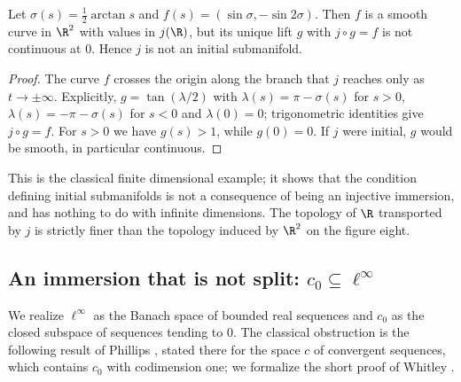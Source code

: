 \begin{theorem}
  \label{thm:ex-lemniscate-not-initial}
  \leanok
  Let $\sigma(s) = \tfrac12\arctan s$ and $f(s) = (\sin\sigma, -\sin 2\sigma)$. Then $f$ is a
  smooth curve in $\R^2$ with values in $j(\R)$, but its unique lift $g$ with $j \circ g = f$ is
  not continuous at $0$. Hence $j$ is not an initial submanifold.
\end{theorem}

\begin{proof}
  \leanok
  The curve $f$ crosses the origin along the branch that $j$ reaches only as $t \to \pm\infty$.
  Explicitly, $g = \tan(\lambda/2)$ with $\lambda(s) = \pi - \sigma(s)$ for $s > 0$,
  $\lambda(s) = -\pi - \sigma(s)$ for $s < 0$ and $\lambda(0) = 0$; trigonometric identities give
  $j \circ g = f$. For $s > 0$ we have $g(s) > 1$, while $g(0) = 0$. If $j$ were initial, $g$
  would be smooth, in particular continuous.
\end{proof}

\begin{remark}
  This is the classical finite dimensional example; it shows that the condition defining
  initial submanifolds is not a consequence of being an injective immersion, and has nothing to
  do with infinite dimensions. The topology of $\R$ transported by $j$ is strictly finer than the
  topology induced by $\R^2$ on the figure eight.
\end{remark}

\subsection{An immersion that is not split: \texorpdfstring{$c_0 \subseteq \ell^\infty$}{c0 in l-infinity}}

We realize $\ell^\infty$ as the Banach space of bounded real sequences and $c_0$ as the closed
subspace of sequences tending to $0$. The classical obstruction is the following result of
Phillips \cite[7.5, pp.~539--540]{Phi40}, stated there for the space $c$ of convergent
sequences, which contains $c_0$ with codimension one; we formalize the short proof of Whitley \cite{Whi66}.

